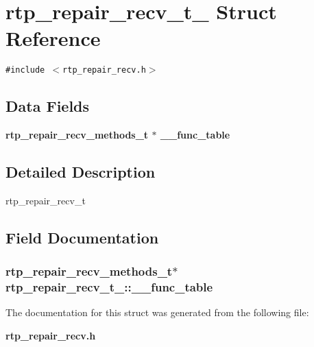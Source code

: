 \section{rtp\_\-repair\_\-recv\_\-t\_\- Struct Reference}
\label{structrtp__repair__recv__t__}
{\tt \#include $<$rtp\_\-repair\_\-recv.h$>$}

\subsection*{Data Fields}
\begin{CompactItemize}
\item 
\bf{rtp\_\-repair\_\-recv\_\-methods\_\-t} $\ast$ \bf{\_\-\_\-func\_\-table}
\end{CompactItemize}


\subsection{Detailed Description}
rtp\_\-repair\_\-recv\_\-t 



\subsection{Field Documentation}
\subsubsection{\setlength{\rightskip}{0pt plus 5cm}\bf{rtp\_\-repair\_\-recv\_\-methods\_\-t}$\ast$ \bf{rtp\_\-repair\_\-recv\_\-t\_\-::\_\-\_\-func\_\-table}}\label{structrtp__repair__recv__t___4b5421d27c0df30f44265450d722a2f2}




The documentation for this struct was generated from the following file:\begin{CompactItemize}
\item 
\bf{rtp\_\-repair\_\-recv.h}\end{CompactItemize}
